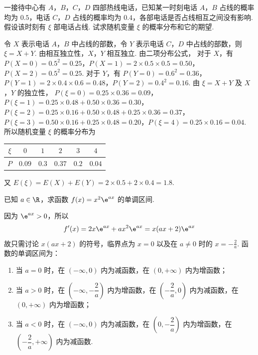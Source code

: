 \begin{problem}
一接待中心有 \(A\)，\(B\)，\(C\)，\(D\) 四部热线电话，已知某一时刻电话 \(A\)，\(B\) 占线的概率均为 \(0.5\)，电话 \(C\)，\(D\) 占线的概率均为 \(0.4\)，各部电话是否占线相互之间没有影响. 假设该时刻有 \(\xi\) 部电话占线. 试求随机变量 \(\xi\) 的概率分布和它的期望.
\end{problem}

\begin{solution}
令 \(X\) 表示电话 \(A\)，\(B\) 中占线的部数，令 \(Y\) 表示电话 \(C\)，\(D\) 中占线的部数，则 \(\xi=X+Y\). 由相互独立性，\(X\)，\(Y\) 相互独立. 由二项分布公式，
对于 \(X\)，有 \(P(X=0)=0.5^2=0.25\)，\(P(X=1)=2\times0.5\times0.5=0.50\)，\(P(X=2)=0.5^2=0.25\). 对于 \(Y\)，有 \(P(Y=0)=0.6^2=0.36\)，\(P(Y=1)=2\times0.4\times0.6=0.48\)，\(P(Y=2)=0.4^2=0.16\).
由 \(\xi=X+Y\) 及 \(X\)，\(Y\) 的独立性，
\(P(\xi=0)=0.25\times0.36=0.09\)，\(P(\xi=1)=0.25\times0.48+0.50\times0.36=0.30\)，\(P(\xi=2)=0.25\times0.16+0.50\times0.48+0.25\times0.36=0.37\)，\(P(\xi=3)=0.50\times0.16+0.25\times0.48=0.20\)，\(P(\xi=4)=0.25\times0.16=0.04\).
所以随机变量 \(\xi\) 的概率分布为
\begin{center}
\begin{tabular}{c|ccccc}
\(\xi\) & \(0\) & \(1\) & \(2\) & \(3\) & \(4\) \\
\hline
\(P\) & \(0.09\) & \(0.3\) & \(0.37\) & \(0.2\) & \(0.04\)
\end{tabular}
\end{center}
又 \(E(\xi)=E(X)+E(Y)=2\times0.5+2\times0.4=1.8\).
\end{solution}

\begin{problem}
已知 \(a \in \R\)，求函数 \(f(x) = x^2 \e^{ax}\) 的单调区间.
\end{problem}

\begin{solution}
因为 \(\e^{ax}>0\)，所以
\[
f'(x)=2x\e^{ax}+ax^2\e^{ax}=x(ax+2)\e^{ax}
\]
故只需讨论 \(x(ax+2)\) 的符号，临界点为 \(x=0\) 以及在 \(a\ne0\) 时的 \(x=-\frac2a\). 函数的单调区间为：
\begin{enumerate}
\item 当 \(a=0\) 时，在 \((-\infty,0)\) 内为减函数，在 \((0,+\infty)\) 内为增函数；
\item 当 \(a>0\) 时，在 \(\left(-\infty,-\dfrac{2}{a}\right)\) 内为增函数，在 \(\left(-\dfrac{2}{a},0\right)\) 内为减函数，在 \((0,+\infty)\) 内为增函数；
\item 当 \(a<0\) 时，在 \((-\infty,0)\) 内为减函数，在 \(\left(0,-\dfrac{2}{a}\right)\) 内为增函数，在 \(\left(-\dfrac{2}{a},+\infty\right)\) 内为减函数.
\end{enumerate}
\end{solution}

